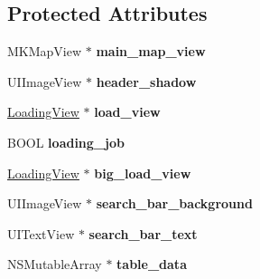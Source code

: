 \subsection*{\-Protected \-Attributes}
\begin{DoxyCompactItemize}
\item 
\hypertarget{interface_google_maps_menu_ad493caf2d5761847266234fe8e5ff234}{
\-M\-K\-Map\-View $\ast$ {\bfseries main\-\_\-map\-\_\-view}}
\label{interface_google_maps_menu_ad493caf2d5761847266234fe8e5ff234}

\item 
\hypertarget{interface_google_maps_menu_a129378ab171dedc08ec6eff6417e321b}{
\-U\-I\-Image\-View $\ast$ {\bfseries header\-\_\-shadow}}
\label{interface_google_maps_menu_a129378ab171dedc08ec6eff6417e321b}

\item 
\hypertarget{interface_google_maps_menu_a7b209b4c104e16e3675094f87916592e}{
\hyperlink{interface_loading_view}{\-Loading\-View} $\ast$ {\bfseries load\-\_\-view}}
\label{interface_google_maps_menu_a7b209b4c104e16e3675094f87916592e}

\item 
\hypertarget{interface_google_maps_menu_a36c4151b264c11fd7c650c352fa64150}{
\-B\-O\-O\-L {\bfseries loading\-\_\-job}}
\label{interface_google_maps_menu_a36c4151b264c11fd7c650c352fa64150}

\item 
\hypertarget{interface_google_maps_menu_ae1fcbea598ad16cf7a2389a10d3da6fb}{
\hyperlink{interface_loading_view}{\-Loading\-View} $\ast$ {\bfseries big\-\_\-load\-\_\-view}}
\label{interface_google_maps_menu_ae1fcbea598ad16cf7a2389a10d3da6fb}

\item 
\hypertarget{interface_google_maps_menu_affbca4ca364a881d77dc75da9a9be1cf}{
\-U\-I\-Image\-View $\ast$ {\bfseries search\-\_\-bar\-\_\-background}}
\label{interface_google_maps_menu_affbca4ca364a881d77dc75da9a9be1cf}

\item 
\hypertarget{interface_google_maps_menu_ae3a49b87d990b530df8fef1d501f7a56}{
\-U\-I\-Text\-View $\ast$ {\bfseries search\-\_\-bar\-\_\-text}}
\label{interface_google_maps_menu_ae3a49b87d990b530df8fef1d501f7a56}

\item 
\hypertarget{interface_google_maps_menu_a74463504fafc03a0f2bd6da1f25281cc}{
\-N\-S\-Mutable\-Array $\ast$ {\bfseries table\-\_\-data}}
\label{interface_google_maps_menu_a74463504fafc03a0f2bd6da1f25281cc}


\end{DoxyCompactItemize}
